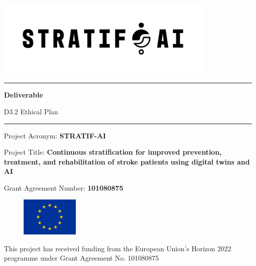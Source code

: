 \begin{center}
\includegraphics[width=0.8\textwidth]{stratifai_logo.png}    
\end{center}

\hrule
\vspace{0.5cm}

\begin{center}
\huge \textbf{Deliverable}
\end{center}

\begin{center}
\Large D3.2 Ethical Plan
\end{center}

\vspace{0.5cm}
\hrule

\vspace{0.5cm}

\large \noindent Project Acronym: \textbf{STRATIF-AI}  

\vspace{0.5cm}

\large \noindent Project Title: \textbf{Continuous stratification for improved prevention, treatment, and rehabilitation of stroke patients using digital twins and AI}  

\vspace{0.5cm}

\large \noindent Grant Agreement Number: \textbf{101080875} 

\vspace{0.5cm}

\begin{figure}
  \includegraphics[width=0.25\textwidth]{EU_flag.jpg}
\end{figure}

\noindent \newline \newline \small This project has received funding from the European Union’s Horizon 2022 programme under Grant Agreement No. 101080875

